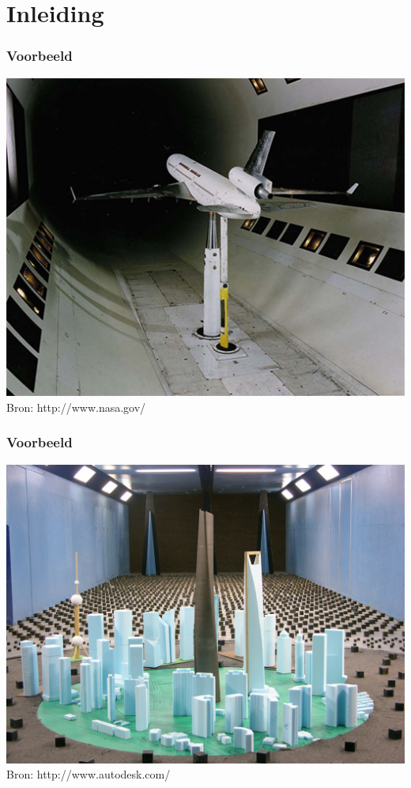 \documentclass[t]{beamer}
\subtitle{Gelijkvormigheid en dimensieloze getallen}
\begin{document}
	\frame{\titlepage}
	\section{Inleiding}
	\begin{frame}
		\frametitle{Voorbeeld}
		\center
    	\includegraphics[height=0.8\textheight]{fig/gelijkvormigheid/airplane_in_windtunnel.jpg}\\
		\footnotesize{Bron: http://www.nasa.gov/}
  	\end{frame}
  	\begin{frame}
		\frametitle{Voorbeeld}
		\center
    	\includegraphics[height=0.8\textheight]{fig/gelijkvormigheid/shanghai_tower_windtunnel.jpg}\\
		\footnotesize{Bron: http://www.autodesk.com/}
  	\end{frame}
\end{document}
